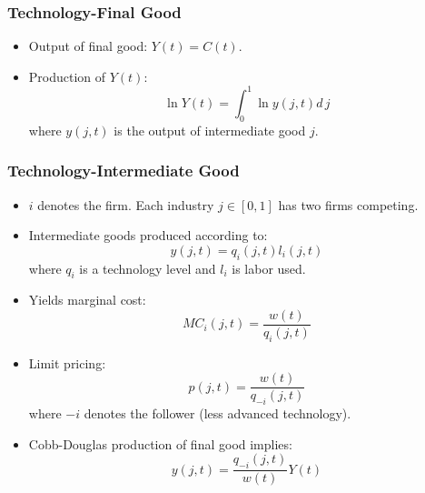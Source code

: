 \documentclass{beamer}
\begin{document}
\begin{frame}[t]\frametitle{Technology-Final Good} 
  \begin{itemize}
    \item<+-> Output of final good: $Y(t) = C(t)$.
    
    \item<+-> Production of $Y(t)$:
      \begin{equation} \label{eq:tech_output}
        \ln Y(t) = \int_{0}^{1} \ln y(j, t) d\,j 
      \end{equation}
      where $y(j, t)$ is the output of intermediate good $j$.
    
  \end{itemize}
\end{frame}

\begin{frame}[t]\frametitle{Technology-Intermediate Good} 
  \begin{itemize}
    \item<+-> $i$ denotes the firm.  Each industry $j \in [0, 1]$ has two firms competing.

    \item<+-> Intermediate goods produced according to:
      \begin{equation*} \label{eq:intermediate_production}
        y(j, t) = q_i(j, t)l_i(j, t)
      \end{equation*}
      where $q_i$ is a technology level and $l_i$ is labor used. 

    \item<+-> Yields marginal cost:
      \begin{equation*} \label{eq:marginal_cost}
        MC_i(j, t) = \frac{w(t)}{q_i(j, t)}
      \end{equation*}

    \item<+-> Limit pricing:
      \begin{equation*} \label{eq:limit_pricing}
        p(j, t) = \frac{w(t)}{q_{-i}(j, t)}      
      \end{equation*}
    where $-i$ denotes the follower (less advanced technology).
    \item<+-> Cobb-Douglas production of final good implies:
      \begin{equation}
        y(j, t) = \frac{q_{-i}(j, t)}{w(t)}Y(t)
      \end{equation}
  \end{itemize}
\end{frame}
\end{document}

